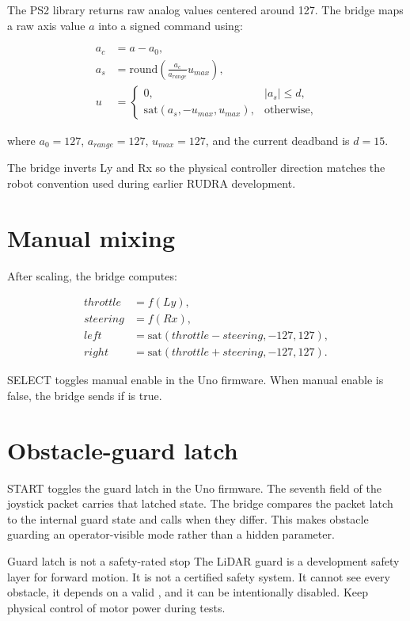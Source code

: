 The PS2 library returns raw analog values centered around 127. The bridge maps a raw axis value \(a\) into a signed command using:

\begin{align}
a_c &= a - a_0,\\
a_s &= \mathrm{round}\left(\frac{a_c}{a_{range}}u_{max}\right),\\
u &= \begin{cases}
0, & |a_s|\leq d,\\
\mathrm{sat}(a_s,-u_{max},u_{max}), & \text{otherwise},
\end{cases}
\end{align}

where \(a_0=127\), \(a_{range}=127\), \(u_{max}=127\), and the current deadband is \(d=15\).

The bridge inverts Ly and Rx so the physical controller direction matches the robot convention used during earlier RUDRA development.

\section{Manual mixing}

After scaling, the bridge computes:

\begin{align}
throttle &= f(Ly),\\
steering &= f(Rx),\\
left &= \mathrm{sat}(throttle-steering,-127,127),\\
right &= \mathrm{sat}(throttle+steering,-127,127).
\end{align}

SELECT toggles manual enable in the Uno firmware. When manual enable is false, the bridge sends  if  is true.

\section{Obstacle-guard latch}

START toggles the guard latch in the Uno firmware. The seventh field of the joystick packet carries that latched state. The bridge compares the packet latch to the internal guard state and calls  when they differ. This makes obstacle guarding an operator-visible mode rather than a hidden parameter.

\begin{safetybox}{Guard latch is not a safety-rated stop}
The LiDAR guard is a development safety layer for forward motion. It is not a certified safety system. It cannot see every obstacle, it depends on a valid , and it can be intentionally disabled. Keep physical control of motor power during tests.
\end{safetybox}

